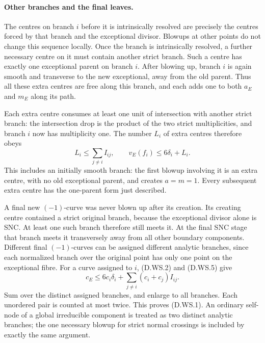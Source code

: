 \paragraph{Other branches and the final leaves.}
The centres on branch $i$ before it is intrinsically resolved are
precisely the centres forced by that branch and the exceptional
divisor.  Blowups at other points do not change this sequence locally.
Once the branch is intrinsically resolved, a further necessary centre
on it must contain another strict branch.  Such a centre has exactly
one exceptional parent on branch $i$.  After blowing up, branch $i$
is again smooth and transverse to the new exceptional, away from the
old parent.  Thus all these extra centres are free along this branch,
and each adds one to both $a_E$ and $m_E$ along its path.

Each extra centre consumes at least one unit of intersection with
another strict branch: the intersection drop is the product of the
two strict multiplicities, and branch $i$ now has multiplicity one.
The number $L_i$ of extra centres therefore obeys
\[
 L_i\le\sum_{j\ne i}I_{ij},\qquad
 v_E(f_i)\le6\delta_i+L_i.                           \tag{D.WS.5}
\]
This includes an initially smooth branch: the first blowup involving it
is an extra centre, with no old exceptional parent, and creates $a=m=1$.
Every subsequent extra centre has the one-parent form just described.

A final new $(-1)$-curve was never blown up after its creation.
Its creating centre contained a strict original branch, because the
exceptional divisor alone is SNC.  At least one such branch therefore
still meets it.  At the final SNC stage that branch meets it transversely
away from all other boundary components.  Different final $(-1)$-curves
can be assigned different analytic branches, since each normalized
branch over the original point has only one point on the exceptional
fibre.  For a curve assigned to $i$, (D.WS.2) and (D.WS.5) give
\[
 c_E\le6c_i\delta_i+\sum_{j\ne i}(c_i+c_j)I_{ij}.
\]
Sum over the distinct assigned branches, and enlarge to all branches.
Each unordered pair is counted at most twice.  This proves (D.WS.1).
An ordinary self-node of a global irreducible component is treated as
two distinct analytic branches; the one necessary blowup for strict
normal crossings is included by exactly the same argument.

